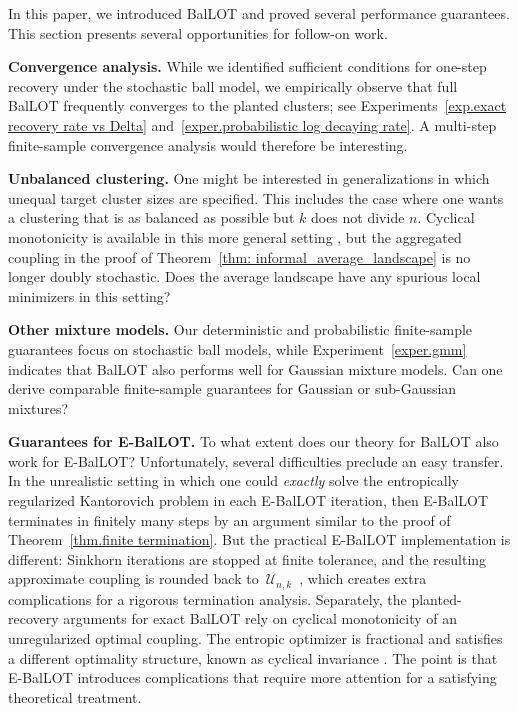 \documentclass{article}
\theoremstyle{plain}
\theoremstyle{definition}
\newcommand{\1}{\mathbf{1}}
\newcommand{\bUnk}{\mathcal{U}_{n,k}}
\newcommand{\bmu}{\bm{\mu}}
\begin{document}
In this paper, we introduced BalLOT and proved several performance guarantees.
This section presents several opportunities for follow-on work.

\medskip
\noindent
\textbf{Convergence analysis.}
While we identified sufficient conditions for one-step recovery under the stochastic ball model, we empirically observe that full BalLOT frequently converges to the planted clusters; see Experiments~\ref{exp.exact recovery rate vs Delta} and~\ref{exper.probabilistic log decaying rate}.
A multi-step finite-sample convergence analysis would therefore be interesting.

\medskip
\noindent
\textbf{Unbalanced clustering.}
One might be interested in generalizations in which unequal target cluster sizes are specified.
This includes the case where one wants a clustering that is as balanced as possible but $k$ does not divide $n$.
Cyclical monotonicity is available in this more general setting \cite{santambrogio2015optimal,DePascal2023cyclical}, but the aggregated coupling in the proof of Theorem~\ref{thm: informal_average_landscape} is no longer doubly stochastic.
Does the average landscape have any spurious local minimizers in this setting?

\medskip
\noindent
\textbf{Other mixture models.}
Our deterministic and probabilistic finite-sample guarantees focus on stochastic ball models, while Experiment~\ref{exper.gmm} indicates that BalLOT also performs well for Gaussian mixture models.
Can one derive comparable finite-sample guarantees for Gaussian or sub-Gaussian mixtures?

\medskip
\noindent
\textbf{Guarantees for E-BalLOT.}
To what extent does our theory for BalLOT also work for E-BalLOT?
Unfortunately, several difficulties preclude an easy transfer.
In the unrealistic setting in which one could \textit{exactly} solve the entropically regularized Kantorovich problem in each E-BalLOT iteration, then 
E-BalLOT terminates in finitely many steps by an argument similar to the proof of Theorem~\ref{thm.finite termination}.
But the practical E-BalLOT implementation is different: Sinkhorn iterations are stopped at finite tolerance, and the resulting approximate coupling is rounded back to~$\bUnk$~\cite{altschuler2017near}, which creates extra complications for a rigorous termination analysis.
Separately, the planted-recovery arguments for exact BalLOT rely on cyclical monotonicity of an unregularized optimal coupling.
The entropic optimizer is fractional and satisfies a different optimality structure, known as cyclical invariance \cite{Nutz2021EntropicOT}.
The point is that E-BalLOT introduces complications that require more attention for a satisfying theoretical treatment.
\end{document}
